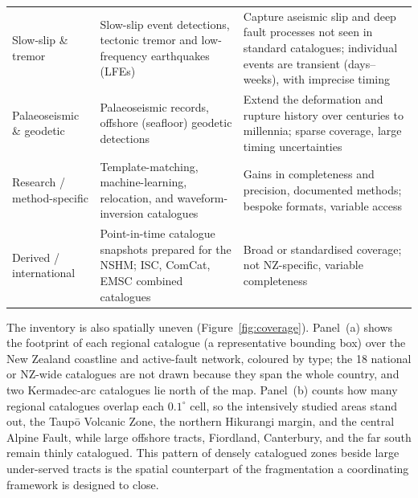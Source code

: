 \documentclass[11pt]{article}
\begin{document}
\begin{table}[H]
\begin{tabular}{@{}>{\raggedright\arraybackslash}p{2.9cm}>{\raggedright\arraybackslash}p{6.1cm}>{\raggedright\arraybackslash}p{6.2cm}@{}}
\addlinespace
Slow-slip \& tremor & Slow-slip event detections, tectonic tremor and low-frequency earthquakes (LFEs) \citep{Wallace2010} & Capture aseismic slip and deep fault processes not seen in standard catalogues; individual events are transient (days--weeks), with imprecise timing \\
\addlinespace
Palaeoseismic \& geodetic & Palaeoseismic records, offshore (seafloor) geodetic detections \citep{Fasola2023} & Extend the deformation and rupture history over centuries to millennia; sparse coverage, large timing uncertainties \\
\addlinespace
Research / method-specific & Template-matching, machine-learning, relocation, and waveform-inversion catalogues \citep{Michailos2025, Chamberlain2025, Eberhart2022} & Gains in completeness and precision, documented methods; bespoke formats, variable access \\
\addlinespace
Derived / international & Point-in-time catalogue snapshots prepared for the NSHM; ISC, ComCat, EMSC combined catalogues \citep{usgs_comcat, isc_data_collection, emsc_webservices} & Broad or standardised coverage; not NZ-specific, variable completeness \\
\bottomrule
\end{tabular}
\end{table}

The inventory is also spatially uneven (Figure~\ref{fig:coverage}). Panel~(a) shows the footprint of each regional catalogue (a representative bounding box) over the New Zealand coastline and active-fault network, coloured by type; the 18 national or NZ-wide catalogues are not drawn because they span the whole country, and two Kermadec-arc catalogues lie north of the map. Panel~(b) counts how many regional catalogues overlap each $0.1^\circ$ cell, so the intensively studied areas stand out, the Taup\=o Volcanic Zone, the northern Hikurangi margin, and the central Alpine Fault, while large offshore tracts, Fiordland, Canterbury, and the far south remain thinly catalogued. This pattern of densely catalogued zones beside large under-served tracts is the spatial counterpart of the fragmentation a coordinating framework is designed to close.
\end{document}
